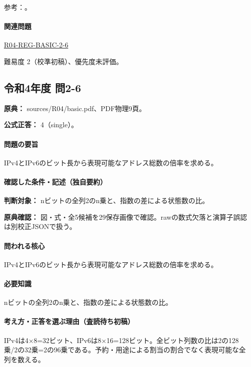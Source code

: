 \par 参考：\cite{rfc4291_addresses}。

\paragraph{関連問題} \hyperref[q:r04-reg-basic-2-6]{R04-REG-BASIC-2-6}

\par 難易度 2（校準初稿）、優先度未評価。

\subsection{令和4年度 問2-6}
\label{q:r04-reg-basic-2-6}

\noindent\textbf{原典：} sources/R04/basic.pdf、PDF物理9頁。

\textbf{公式正答：} 4（single）。

\paragraph{問題の要旨} IPv4とIPv6のビット長から表現可能なアドレス総数の倍率を求める。

\paragraph{確認した条件・記述（独自要約）}\mbox{}\par

\noindent\textbf{判断対象：} nビットの全列2のn乗と、指数の差による状態数の比。\par

\noindent\textbf{原典確認：} 図・式・全5候補を29保存画像で確認。rawの数式欠落と演算子誤認は別校正JSONで扱う。\par

\paragraph{問われる核心} IPv4とIPv6のビット長から表現可能なアドレス総数の倍率を求める。

\paragraph{必要知識} nビットの全列2のn乗と、指数の差による状態数の比。

\paragraph{考え方・正答を選ぶ理由（査読待ち初稿）} IPv4は4×8=\allowbreak{}32ビット、IPv6は8×16=\allowbreak{}128ビット。全ビット列数の比は2の128乗/2の32乗=2の96乗である。予約・用途による割当の割合でなく表現可能な全列を数える。

